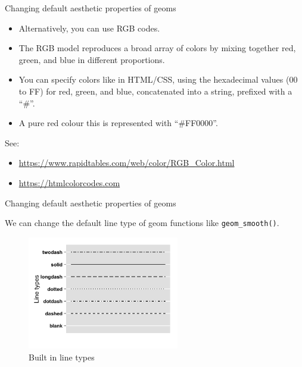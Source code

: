 \documentclass[ignorenonframetext,]{beamer}
\providecommand{\tightlist}{%
  \setlength{\itemsep}{0pt}\setlength{\parskip}{0pt}}
\begin{document}
\begin{frame}{Changing default aesthetic properties of geoms}
\protect\hypertarget{changing-default-aesthetic-properties-of-geoms-17}{}

\begin{itemize}
\item
  Alternatively, you can use RGB codes.
\item
  The RGB model reproduces a broad array of colors by mixing together
  red, green, and blue in different proportions.
\item
  You can specify colors like in HTML/CSS, using the hexadecimal values
  (00 to FF) for red, green, and blue, concatenated into a string,
  prefixed with a ``\#''.
\item
  A pure red colour this is represented with ``\#FF0000''.
\end{itemize}

See:

\begin{itemize}
\tightlist
\item
  \url{https://www.rapidtables.com/web/color/RGB_Color.html}
\item
  \url{https://htmlcolorcodes.com}
\end{itemize}

\end{frame}

\begin{frame}[fragile]{Changing default aesthetic properties of geoms}
\protect\hypertarget{changing-default-aesthetic-properties-of-geoms-18}{}

We can change the default line type of geom functions like
\texttt{geom\_smooth()}.

\begin{figure}
\centering
\includegraphics[width=2.60417in,height=\textheight]{figures/lty.png}
\caption{Built in line types}
\end{figure}

\end{frame}
\end{document}
